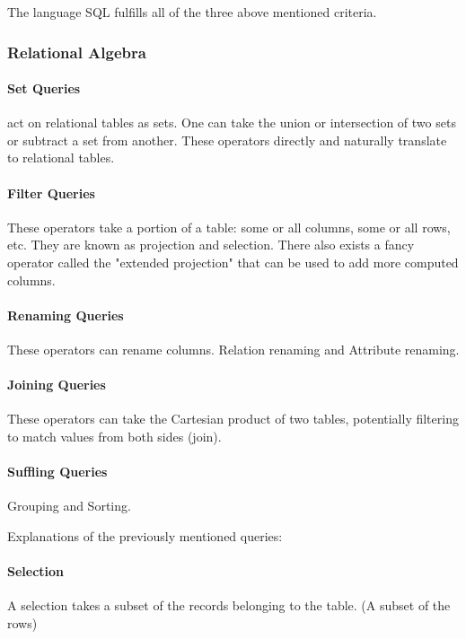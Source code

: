 \vspace{1\baselineskip}

The language SQL fulfills all of the three above mentioned criteria.


\subsubsection{Relational Algebra}

\paragraph{Set Queries} act on relational tables as sets. One can take the union or intersection of two sets or subtract a set from another. These operators directly and naturally translate to relational tables.

\paragraph{Filter Queries} These operators take a portion of a table: some or all columns, some or all rows, etc. They are known as projection and selection. There also exists a fancy operator called the "extended projection" that can be used to add more computed columns.

\paragraph{Renaming Queries} These operators can rename columns. Relation renaming and Attribute renaming.

\paragraph{Joining Queries} These operators can take the Cartesian product of two tables, potentially filtering to match values from both sides (join).

\paragraph{Suffling Queries} Grouping and Sorting.

\vspace{1\baselineskip}

Explanations of the previously mentioned queries:

\paragraph{Selection}
A selection takes a subset of the records belonging to the table. (A subset of the rows)

